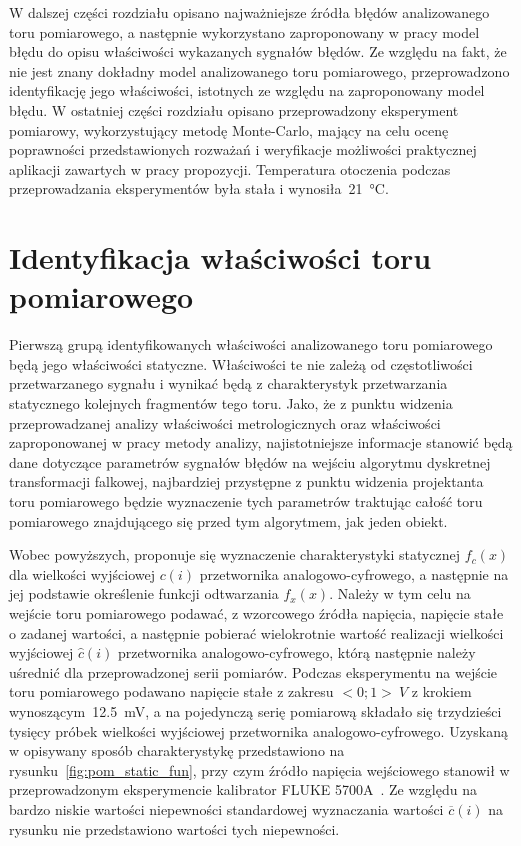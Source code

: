 W dalszej części rozdziału opisano najważniejsze źródła błędów analizowanego toru pomiarowego, a następnie wykorzystano zaproponowany w pracy model błędu do opisu właściwości wykazanych sygnałów błędów. Ze względu na fakt, że nie jest znany dokładny model analizowanego toru pomiarowego, przeprowadzono identyfikację jego właściwości, istotnych ze względu na zaproponowany model błędu. W ostatniej części rozdziału opisano przeprowadzony eksperyment pomiarowy, wykorzystujący metodę Monte-Carlo, mający na celu ocenę poprawności przedstawionych rozważań i weryfikacje możliwości praktycznej aplikacji zawartych w pracy propozycji. Temperatura otoczenia podczas przeprowadzania eksperymentów była stała i wynosiła~\qty{21}{\degreeCelsius}.

\section{Identyfikacja właściwości toru pomiarowego}

Pierwszą grupą identyfikowanych właściwości analizowanego toru pomiarowego będą jego właściwości statyczne. Właściwości te nie zależą od częstotliwości przetwarzanego sygnału i wynikać będą z charakterystyk przetwarzania statycznego kolejnych fragmentów tego toru. Jako, że z punktu widzenia przeprowadzanej analizy właściwości metrologicznych oraz właściwości zaproponowanej w pracy metody analizy, najistotniejsze informacje stanowić będą dane dotyczące parametrów sygnałów błędów na wejściu algorytmu dyskretnej transformacji falkowej, najbardziej przystępne z punktu widzenia projektanta toru pomiarowego będzie wyznaczenie tych parametrów traktując całość toru pomiarowego znajdującego się przed tym algorytmem, jak jeden obiekt.

Wobec powyższych, proponuje się wyznaczenie charakterystyki statycznej $f_{c}(x)$ dla wielkości wyjściowej $c(i)$ przetwornika analogowo-cyfrowego, a następnie na jej podstawie określenie funkcji odtwarzania $f_{x}(x)$. Należy w tym celu na wejście toru pomiarowego podawać, z wzorcowego źródła napięcia, napięcie stałe o zadanej wartości, a następnie pobierać wielokrotnie wartość realizacji wielkości wyjściowej $\hat{c}(i)$ przetwornika analogowo-cyfrowego, którą następnie należy uśrednić dla przeprowadzonej serii pomiarów. Podczas eksperymentu na wejście toru pomiarowego podawano napięcie stałe z zakresu $<0;1>~\unit{V}$ z krokiem wynoszącym~\qty{12.5}{mV}, a na pojedynczą serię pomiarową składało się trzydzieści tysięcy próbek wielkości wyjściowej przetwornika analogowo-cyfrowego. Uzyskaną w opisywany sposób charakterystykę przedstawiono na rysunku~\ref{fig:pom_static_fun}, przy czym źródło napięcia wejściowego stanowił w przeprowadzonym eksperymencie kalibrator FLUKE 5700A~\cite{fluke_manual}. Ze względu na bardzo niskie wartości niepewności standardowej wyznaczania wartości $\overline{c}(i)$ na rysunku nie przedstawiono wartości tych niepewności.

